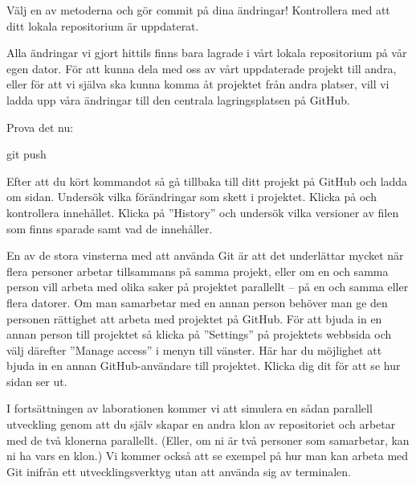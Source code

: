 \begin{Datorarbete}
	\code{[\ref{git-commit-a}]} Välj en av metoderna och gör commit på dina ändringar! Kontrollera med  att ditt lokala repositorium är uppdaterat.
	\\

	\item Alla ändringar vi gjort hittils finns bara lagrade i vårt lokala repositorium på vår egen dator. För att kunna dela med oss av vårt uppdaterade projekt till andra, eller för att vi själva ska kunna komma åt projektet från andra platser, vill vi ladda upp våra ändringar till den centrala lagringsplatsen på GitHub.

	Prova det nu:

	\begin{Code}
		git push
	\end{Code}

	Efter att du kört kommandot så gå tillbaka till ditt projekt på GitHub och ladda om sidan. Undersök vilka förändringar som skett i projektet. Klicka på  och kontrollera innehållet. Klicka på ''History'' och undersök vilka versioner av filen som finns sparade samt vad de innehåller.

	\item En av de stora vinsterna med att använda Git är att det underlättar mycket när flera personer arbetar tillsammans på samma projekt, eller om en och samma person vill arbeta med olika saker på projektet parallellt -- på en och samma eller flera datorer. Om man samarbetar med en annan person behöver man ge den personen rättighet att arbeta med projektet på GitHub. För att bjuda in en annan person till projektet så klicka på ''Settings'' på projektets webbsida och välj därefter ''Manage access'' i menyn till vänster. Här har du möjlighet att bjuda in en annan GitHub-användare till projektet. Klicka dig dit för att se hur sidan ser ut.

	I fortsättningen av laborationen kommer vi att simulera en sådan parallell utveckling genom att du själv skapar en andra klon av repositoriet och arbetar med de två klonerna parallellt. (Eller, om ni är två personer som samarbetar, kan ni ha vars en klon.) Vi kommer också att se exempel på hur man kan arbeta med Git inifrån ett utvecklingsverktyg utan att använda sig av terminalen.



\end{Datorarbete}
